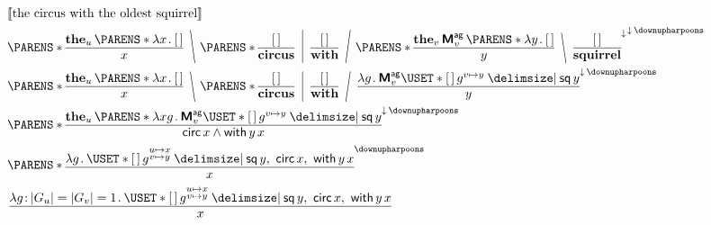 \documentclass[10pt,fleqn]{article}
\newcommand{\M}{\text{\sffamily\bfseries M}}
\begin{document}
\begin{minipage}[t]{0.5\textwidth} %
\begin{align*} %
  &
  \sv{\textrm{the circus with the oldest squirrel}} \\
  &
  \p{%
    \bitt{\textbf{the}_u\,\p{\l x \dt \hole}}{x}
    \BSL{%
    \p{%
      \bitt{\hole}{\textbf{circus}}
      \MSL{%
      \bitt{\hole}{\textbf{with}}
      \FSL{%
      \p{%
        \bitt{\textbf{the}_v\,\M_v^\cn{ag}\,\p{\l y \dt \hole}}{y}
        \BSL{%
        \bitt{\hole}{\textbf{squirrel}}
        }
      }^{\dnar} } }
    } }
  }^{\dnar\,\reset} \\
  &
  \p{%
    \bitt{\textbf{the}_u\,\p{\l x \dt \hole}}{x}
    \BSL{%
    \p{%
      \bitt{\hole}{\textbf{circus}}
      \MSL{%
      \bitt{\hole}{\textbf{with}}
      \FSL{%
      \bitt{%
        \l g \dt \M_v^\cn{ag}\uset{\hole\,g^{v\mapsto y} \giv \cn{sq}\,y}
      }{y}
      } }
    } }
  }^{\dnar\,\reset} \\
  &
  \p{%
    \bitt{%
      \textbf{the}_u\,\p{%
        \l xg \dt \M_v^\cn{ag}\uset{\hole\,g^{v\mapsto y} \giv \cn{sq}\,y}
      }
    }{%
      \cn{circ}\,x \land \cn{with}\,y\,x
    }
  }^{\dnar\,\reset} \\
  &
  \p{%
    \bitt{%
      \l g \dt
        \uset{%
          \hole\,g^{\substack{u\mapsto x\\ v\mapsto y}}
        \giv
          \cn{sq}\,y,\ \cn{circ}\,x,\ \cn{with}\,y\,x
        }
    }{x}
  }^{\reset} \\
  &
  \bitt{%
    \l g \col |G_u| = |G_v| = 1 \dt
      \uset{%
        \hole\,g^{\substack{u\mapsto x\\ v\mapsto y}}
      \giv
        \cn{sq}\,y,\ \cn{circ}\,x,\ \cn{with}\,y\,x
      }
  }{x}
\end{align*}
\end{minipage}
%
%
\end{document}
